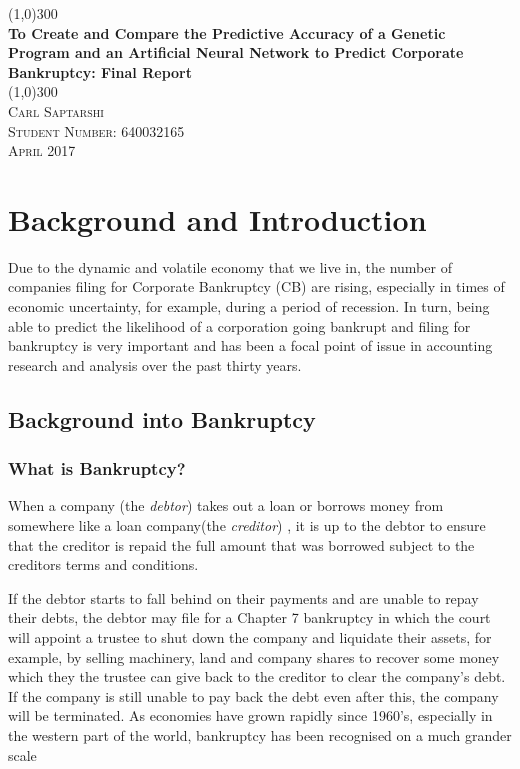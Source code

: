 \documentclass[11pt]{article}
\begin{document}
	\begin{titlepage}
		\begin{center}
			\line(1,0){300}\\
			[0.25in]
			\huge{\bfseries To Create and Compare the Predictive Accuracy of a Genetic Program and an Artificial Neural Network to Predict Corporate Bankruptcy: Final Report}\\
			\line(1,0){300}\\
			[1.5cm]
			
			 \textsc{Carl Saptarshi}\\
			 \textsc{\large  Student Number: 640032165 \\
			 April 2017}
			 
		\end{center}
	\end{titlepage}

\tableofcontents
\thispagestyle{empty}

\cleardoublepage
\setcounter{page}{1}
\section{Background and Introduction }\label{sec:intro}


Due to the dynamic and volatile economy that we live in, the number of companies filing for Corporate Bankruptcy (CB) are rising, especially in times of economic uncertainty, for example, during a period of recession. In turn, being able to predict the likelihood of a corporation going bankrupt and filing for bankruptcy is very important and has been a focal point of issue in accounting research and analysis over the past thirty years\cite{?}. 

\subsection{Background into Bankruptcy}
\subsubsection{What is Bankruptcy? }\label{sec:bankdef}
When a company (the \textit{debtor}) takes out a loan or borrows money from somewhere like a loan company(the \textit{creditor}) , it is up to the debtor to ensure that the creditor is repaid the full amount that was borrowed subject to the creditors terms and conditions.


If the debtor starts to fall behind on their payments and are unable to repay their debts, the debtor may file for a Chapter 7 bankruptcy in which the court will appoint a trustee to shut down the company and liquidate their assets, for example, by selling machinery, land and company shares to recover some money which they the trustee can give back to the creditor to clear the company's debt. If the company is still unable to pay back the debt even after this, the company will be terminated. As economies have grown rapidly since 1960's, especially in the western part of the world, bankruptcy has been recognised on a much grander scale\cite{?}
\end{document}
